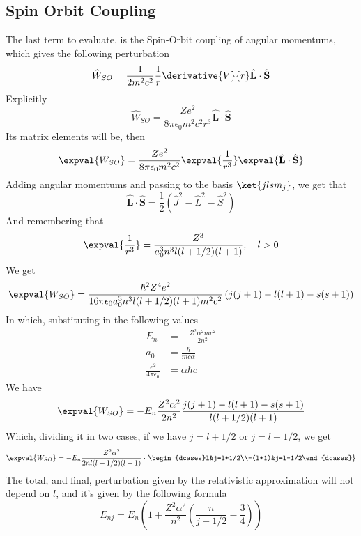 \documentclass[a4paper, 11pt]{book}
\renewcommand{\vec}[1]{\mathbf{#1}}
\newcommand{\1}{\opr{\mathds{1}}}
\newcommand{\opr}[1]{\hat{#1}}
\newcommand{\vecopr}[1]{\opr{\vec{#1}}}
\theoremstyle{plain}
\begin{document}
	\subsection{Spin Orbit Coupling}
	The last term to evaluate, is the Spin-Orbit coupling of angular momentums, which gives the following perturbation
	\begin{equation}
		\opr{W}_{SO}=\frac{1}{2m^2c^2}\frac{1}{r}\derivative{V}{r}\vecopr{L}\cdot\vecopr{S}
		\label{eq:spinorbitpert}
	\end{equation}
	Explicitly
	\begin{equation}
		\opr{W}_{SO}=\frac{Ze^2}{8\pi\epsilon_0m^2c^2r^3}\vecopr{L}\cdot\vecopr{S}
		\label{eq:spinorbitpertexp}
	\end{equation}
	Its matrix elements will be, then
	\begin{equation}
		\expval{W_{SO}}=\frac{Ze^2}{8\pi\epsilon_0m^2c^2}\expval{\frac{1}{r^3}}\expval{\vecopr{L}\cdot\vecopr{S}}
		\label{eq:matrixelementssoint}
	\end{equation}
	Adding angular momentums and passing to the basis $\ket{jlsm_j}$, we get that
	\begin{equation*}
		\vecopr{L}\cdot\vecopr{S}=\frac{1}{2}\left( \opr{J}^2-\opr{L}^2-\opr{S}^2 \right)
	\end{equation*}
	And remembering that
	\begin{equation*}
		\expval{\frac{1}{r^3}}=\frac{Z^3}{a_0^3n^3l(l+1/2)(l+1)},\quad l>0
	\end{equation*}
	We get
	\begin{equation}
		\expval{W_{SO}}=\frac{\hbar^2Z^4e^2}{16\pi\epsilon_0a_0^3n^3l(l+1/2)(l+1)m^2c^2}\left( j(j+1)-l(l+1)-s(s+1) \right)
		\label{eq:wsocomplete}
	\end{equation}
	In which, substituting in the following values
	\begin{equation*}
		\begin{aligned}
			E_n&=-\frac{Z^2\alpha^2mc^2}{2n^2}\\
			a_0&=\frac{\hbar}{mc\alpha}\\
			\frac{e^2}{4\pi\epsilon_0}&=\alpha\hbar c
		\end{aligned}
	\end{equation*}
	We have
	\begin{equation}
		\expval{W_{SO}}=-E_n\frac{Z^2\alpha^2}{2n^2}\frac{j(j+1)-l(l+1)-s(s+1)}{l(l+1/2)(l+1)}
		\label{eq:wsosubstituted}
	\end{equation}
	Which, dividing it in two cases, if we have $j=l+1/2$ or $j=l-1/2$, we get
	\begin{equation}
		\expval{W_{SO}}=-E_n\frac{Z^2\alpha^2}{2nl(l+1/2)(l+1)}\cdot\left.\begin{dcases}l&j=l+1/2\\-(l+1)&j=l-1/2\end{dcases}\right\}
		\label{eq:spinorbitcomplete}
	\end{equation}
	The total, and final, perturbation given by the relativistic approximation will not depend on $l$, and it's given by the following formula
	\begin{equation}
		E_{nj}=E_n\left( 1+\frac{Z^2\alpha^2}{n^2}\left( \frac{n}{j+1/2}-\frac{3}{4} \right) \right)
		\label{eq:finalpertrelcorr}
	\end{equation}
\end{document}
